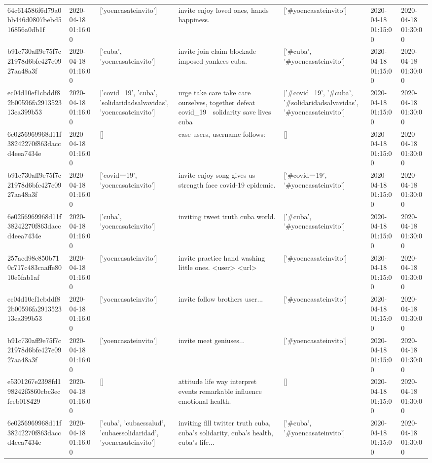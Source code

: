 \begin{tabular}{lllllll}
64c614586f6d79a0bb446d0807bebd516856a0db1f & 2020-04-18 01:16:00 & ['yoencasateinvito'] & invite enjoy loved ones, hands happiness. & ['#yoencasateinvito'] & 2020-04-18 01:15:00 & 2020-04-18 01:30:00 \\
b91c730aff9e75f7c21978d6bfe427e0927aa48a3f & 2020-04-18 01:16:00 & ['cuba', 'yoencasateinvito'] & invite join claim blockade imposed yankees cuba. & ['#cuba', '#yoencasateinvito'] & 2020-04-18 01:15:00 & 2020-04-18 01:30:00 \\
ec04d10ef1cbddf82b00596fa291352313ea399b53 & 2020-04-18 01:16:00 & ['covid_19', 'cuba', 'solidaridadsalvavidas', 'yoencasateinvito'] & urge take care take care ourselves, together defeat covid\_19 👏 solidarity save lives cuba & ['#covid_19', '#cuba', '#solidaridadsalvavidas', '#yoencasateinvito'] & 2020-04-18 01:15:00 & 2020-04-18 01:30:00 \\
6e0256969968d11f38242270f863daccd4eea7434e & 2020-04-18 01:16:00 & [] & case users, username follows: & [] & 2020-04-18 01:15:00 & 2020-04-18 01:30:00 \\
b91c730aff9e75f7c21978d6bfe427e0927aa48a3f & 2020-04-18 01:16:00 & ['covidー19', 'yoencasateinvito'] & invite enjoy song gives us strength face covid-19 epidemic. & ['#covidー19', '#yoencasateinvito'] & 2020-04-18 01:15:00 & 2020-04-18 01:30:00 \\
6e0256969968d11f38242270f863daccd4eea7434e & 2020-04-18 01:16:00 & ['cuba', 'yoencasateinvito'] & inviting tweet truth cuba world. & ['#cuba', '#yoencasateinvito'] & 2020-04-18 01:15:00 & 2020-04-18 01:30:00 \\
257acd98e850b710c717c483caaffe8010e5fab1af & 2020-04-18 01:16:00 & ['yoencasateinvito'] & invite practice hand washing little ones. <user> <url> & ['#yoencasateinvito'] & 2020-04-18 01:15:00 & 2020-04-18 01:30:00 \\
ec04d10ef1cbddf82b00596fa291352313ea399b53 & 2020-04-18 01:16:00 & ['yoencasateinvito'] & invite follow brothers user... & ['#yoencasateinvito'] & 2020-04-18 01:15:00 & 2020-04-18 01:30:00 \\
b91c730aff9e75f7c21978d6bfe427e0927aa48a3f & 2020-04-18 01:16:00 & ['yoencasateinvito'] & invite meet geniuses... & ['#yoencasateinvito'] & 2020-04-18 01:15:00 & 2020-04-18 01:30:00 \\
e5301267e2398fd198242f5860cbc3ecfceb018429 & 2020-04-18 01:16:00 & [] & attitude life way interpret events remarkable influence emotional health. & [] & 2020-04-18 01:15:00 & 2020-04-18 01:30:00 \\
6e0256969968d11f38242270f863daccd4eea7434e & 2020-04-18 01:16:00 & ['cuba', 'cubaessalud', 'cubaessolidaridad', 'yoencasateinvito'] & inviting fill twitter truth cuba, cuba's solidarity, cuba's health, cuba's life... & ['#cuba', '#yoencasateinvito'] & 2020-04-18 01:15:00 & 2020-04-18 01:30:00 \\

\end{tabular}
